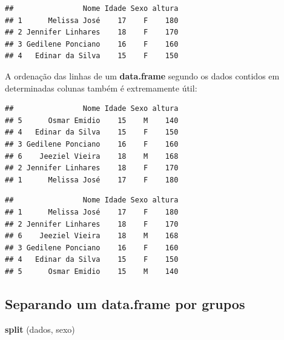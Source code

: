 \documentclass[
]{book}
\newenvironment{Shaded}{\begin{snugshade}}{\end{snugshade}}
\newcommand{\KeywordTok}[1]{\textcolor[rgb]{0.13,0.29,0.53}{\textbf{#1}}}
\newcommand{\NormalTok}[1]{#1}
\newcommand{\OperatorTok}[1]{\textcolor[rgb]{0.81,0.36,0.00}{\textbf{#1}}}
\begin{document}
\begin{verbatim}
##                Nome Idade Sexo altura
## 1      Melissa José    17    F    180
## 2 Jennifer Linhares    18    F    170
## 3 Gedilene Ponciano    16    F    160
## 4   Edinar da Silva    15    F    150
\end{verbatim}

A ordenação das linhas de um \textbf{data.frame} segundo os dados contidos em determinadas colunas também é extremamente útil:

\begin{Shaded}
\end{Shaded}

\begin{verbatim}
##                Nome Idade Sexo altura
## 5      Osmar Emidio    15    M    140
## 4   Edinar da Silva    15    F    150
## 3 Gedilene Ponciano    16    F    160
## 6    Jeeziel Vieira    18    M    168
## 2 Jennifer Linhares    18    F    170
## 1      Melissa José    17    F    180
\end{verbatim}

\begin{Shaded}
\end{Shaded}

\begin{verbatim}
##                Nome Idade Sexo altura
## 1      Melissa José    17    F    180
## 2 Jennifer Linhares    18    F    170
## 6    Jeeziel Vieira    18    M    168
## 3 Gedilene Ponciano    16    F    160
## 4   Edinar da Silva    15    F    150
## 5      Osmar Emidio    15    M    140
\end{verbatim}

\hypertarget{separando-um-data.frame-por-grupos}{%
\subsection{Separando um data.frame por grupos}\label{separando-um-data.frame-por-grupos}}

\begin{Shaded}
\begin{Highlighting}[]
\KeywordTok{split}\NormalTok{ (dados, sexo)}
\end{Highlighting}
\end{Shaded}
\end{document}
